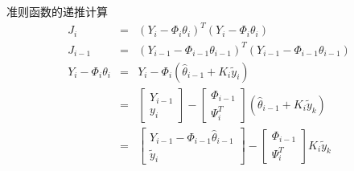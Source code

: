\begin{frame}{准则函数的递推计算}
\begin{eqnarray*}
J_{i} &=& (Y_i-\Phi_i\theta_i)^T (Y_i-\Phi_i\theta_i)   \\
J_{i-1} &=& (Y_{i-1}-\Phi_{i-1}\theta_{i-1})^T (Y_{i-1}-\Phi_{i-1}\theta_{i-1}) \\
Y_i-\Phi_i\theta_i &=& Y_i - \Phi_i (\hat\theta_{i-1}+K_i \tilde y_i) \\
&=& \begin{bmatrix}  Y_{i-1}  \\  y_i \end{bmatrix} -\begin{bmatrix}\Phi_{i-1} \\ \Psi_i^T \end{bmatrix} (\hat\theta_{i-1}+ K_i \tilde y_k)  \\
&=& \begin{bmatrix} Y_{i-1}-\Phi_{i-1}\hat\theta_{i-1}  \\ \tilde y_i \end{bmatrix} -\begin{bmatrix}\Phi_{i-1} \\ \Psi_i^T \end{bmatrix}  K_i \tilde y_k  \\
\end{eqnarray*}
\end{frame}

